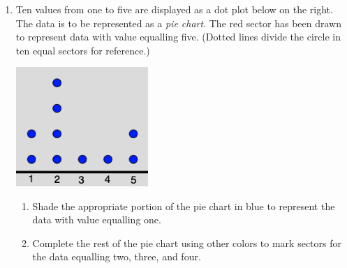\begin{enumerate}
\item Ten values from one to five are displayed as a dot plot below on the right. \\[0.5cm]
The data is to be represented as a \emph{pie chart}. The red sector has been drawn to represent data with value equalling five. (Dotted lines divide the circle in ten equal sectors for reference.)
  \begin{multicols}{2}
  \includegraphics[width=5cm]{../graphics/11DotPlot.png}
  \end{multicols}
  \begin{enumerate}
    \item Shade the appropriate portion of the pie chart in blue to represent the data with value equalling one.
    \item Complete the rest of the pie chart using other colors to mark sectors for the data equalling two, three, and four.
  \end{enumerate}


\end{enumerate}
